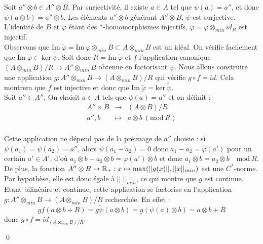 \begin{dem}
Soit $a''\otimes b \in A''\otimes B$. Par surjectivité, il existe $a\in A$ tel que $\psi(a)=a''$, et donc $\tilde\psi(a\otimes b ) = a''\otimes b$. Les éléments $a''\otimes b$ générant $A''\otimes B$, $\tilde \psi$ est surjective.\\

L'identité de $B$ et $\varphi$ étant des $*$-homomorphismes injectifs, $\tilde\varphi = \varphi \otimes_{min}id_B$ est injectif.\\

Observons que $\text{Im} \ \tilde\varphi =\text{Im}\ \varphi \otimes_{min} B\subset A\otimes_{min} B$ est un idéal.  On vérifie facilement que $\text{Im} \ \tilde\varphi \subset \text{ker}\ \tilde \psi $. Soit donc $R=\text{Im} \ \tilde\varphi$ et $f$ l'application canonique $(A\otimes_{min} B)/ R \rightarrow A''\otimes_{min} B$ obtenue en factorisant $\tilde \psi$. Nous allons construire une application $g : A''\otimes_{min} B \rightarrow (A\otimes_{min} B)/ R $ qui vérifie $g\circ f = id $. Cela montrera que $f$ est injective et donc que $\text{Im} \ \tilde\varphi = \text{ker}\ \tilde \psi $.\\

Soit $a''\in A''$. On choisit $a\in A$ tels que $\psi(a)=a''$ et on définit : 
\[\begin{array}{rcl}
A''\times B & \rightarrow & (A\otimes B) /R \\
a'', b          & \mapsto     & a\otimes b \ (\text{mod} \ R)\\
\end{array}\] 

Cette application ne dépend pas de la préimage de $a''$ choisie : si $\psi(a_1)=\psi(a_2)=a''$, alors $\psi(a_1-a_2)=0$ donc $a_1-a_2=\varphi(a')$ pour un certain $a'\in A'$, d'où $a_1\otimes b -a_2\otimes b = \varphi(a')\otimes b$ et donc $a_1\otimes b = a_2\otimes b \quad \text{mod}\ R$.\\
De plus, la fonction $A''\otimes B\rightarrow \mathbb R_+ :  x\mapsto \max (||g(x)||, ||x||_{min})$ est une $C^*$-norme. Par hypothèse, elle est donc égale à $||.||_{min}$, ce qui montre que $g$ est continue.
Etant bilinéaire et continue, cette application se factorise en l'application $g : A''\otimes_{min} B \rightarrow (A\otimes_{min} B) /R$ recherchée. En effet :
\[gf(a\otimes b + R )= g\tilde\psi(a\otimes b)= g(\psi(a)\otimes b)=a\otimes b +R\]
donc $g\circ f = id_{(A\otimes_{min} B)/R}$.

\qed
\end{dem}

